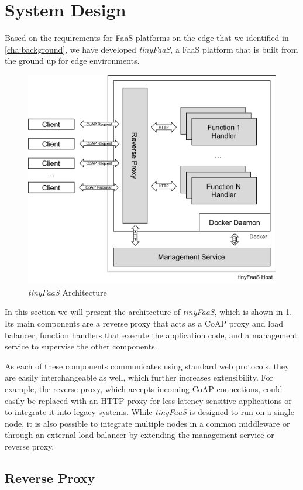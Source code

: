 \section{System Design}
\label{cha:systemdesign}

Based on the requirements for FaaS platforms on the edge that we identified in \cref{cha:background}, we have developed \textit{tinyFaaS}, a FaaS platform that is built from the ground up for edge environments.

\begin{figure}
    \centering
    \includegraphics[width=0.66\columnwidth]{fig/architecture.pdf}
    \caption{\textit{tinyFaaS} Architecture}
    \label{fig:systemdesign}
\end{figure}

In this section we will present the architecture of \textit{tinyFaaS}, which is shown in \cref{fig:systemdesign}.
Its main components are a reverse proxy that acts as a CoAP proxy and load balancer, function handlers that execute the application code, and a management service to supervise the other components.

As each of these components communicates using standard web protocols, they are easily interchangeable as well, which further increases extensibility.
For example, the reverse proxy, which accepts incoming CoAP connections, could easily be replaced with an HTTP proxy for less latency-sensitive applications or to integrate it into legacy systems.
While \textit{tinyFaaS} is designed to run on a single node, it is also possible to integrate multiple nodes in a common middleware or through an external load balancer by extending the management service or reverse proxy.

\subsection{Reverse Proxy}
\label{sec:reverseproxy}

